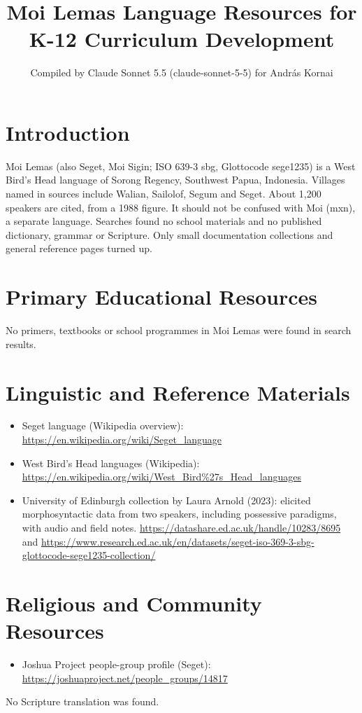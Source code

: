 \documentclass[12pt]{article}
\title{Moi Lemas Language Resources for K-12 Curriculum Development}
\author{Compiled by Claude Sonnet 5.5 (claude-sonnet-5-5) for Andr\'as Kornai}
\date{}
\begin{document}
\maketitle

\section{Introduction}
Moi Lemas (also Seget, Moi Sigin; ISO 639-3 sbg, Glottocode sege1235) is a West Bird's Head language of Sorong Regency, Southwest Papua, Indonesia. Villages named in sources include Walian, Sailolof, Segum and Seget. About 1,200 speakers are cited, from a 1988 figure. It should not be confused with Moi (mxn), a separate language. Searches found no school materials and no published dictionary, grammar or Scripture. Only small documentation collections and general reference pages turned up.

\section{Primary Educational Resources}
No primers, textbooks or school programmes in Moi Lemas were found in search results.

\section{Linguistic and Reference Materials}
\begin{itemize}
\item Seget language (Wikipedia overview): \url{https://en.wikipedia.org/wiki/Seget_language}
\item West Bird's Head languages (Wikipedia): \url{https://en.wikipedia.org/wiki/West_Bird%27s_Head_languages}
\item University of Edinburgh collection by Laura Arnold (2023): elicited morphosyntactic data from two speakers, including possessive paradigms, with audio and field notes. \url{https://datashare.ed.ac.uk/handle/10283/8695} and \url{https://www.research.ed.ac.uk/en/datasets/seget-iso-369-3-sbg-glottocode-sege1235-collection/}
\end{itemize}

\section{Religious and Community Resources}
\begin{itemize}
\item Joshua Project people-group profile (Seget): \url{https://joshuaproject.net/people_groups/14817}
\end{itemize}
No Scripture translation was found.
\end{document}
